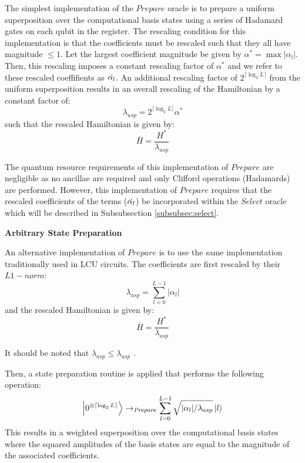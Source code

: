 The simplest implementation of the $\textit{Prepare}$ oracle is to prepare a uniform superposition over the computational basis states using a series of Hadamard gates on each qubit in the register.
The rescaling condition for this implementation is that the coefficients must be rescaled such that they all have magnitude $\leq 1$.
Let the largest coefficient magnitude be given by $\alpha^* = \max{|\alpha_l|}$.
Then, this rescaling imposes a constant rescaling factor of $\alpha^*$ and we refer to these rescaled coeffifients as $\Tilde{\alpha_l}$.
An additional rescaling factor of $2^{\lceil \log_2{L} \rceil}$ from the uniform superposition results in an overall rescaling of the Hamiltonian by a constant factor of:
\begin{equation}
    \lambda_{usp} = 2^{\lceil \log_2{L} \rceil} \alpha^*
\end{equation}
such that the rescaled Hamiltonian is given by:
\begin{equation}
    \bar{H} = \frac{H^*}{\lambda_{usp}}
\end{equation}

The quantum resource requirements of this implementation of $\textit{Prepare}$ are negligible as no ancillae are required and only Clifford operations (Hadamards) are performed.
However, this implementation of $\textit{Prepare}$ requires that the rescaled coefficients of the terms ($\Tilde{\alpha_l}$) be incorporated within the $\textit{Select}$ oracle which will be described in Subsubsection \ref{subsubsec:select}.

\textbf{Arbitrary State Preparation}

An alternative implementation of $\textit{Prepare}$ is to use the same implementation traditionally used in LCU circuits.
The coefficients are first rescaled by their $L1-norm$:
\begin{equation}
    \lambda_{asp} = \sum_{l=0}^{L-1} |\alpha_l|
\end{equation}
and the rescaled Hamiltonian is given by:
\begin{equation}
    \bar{H} = \frac{H^*}{\lambda_{asp}}
\end{equation}

It should be noted that $\lambda_{asp} \leq \lambda_{usp}$  .

Then, a state preparation routine is applied that performs the following operation:
\begin{equation}
    \ket{0^{\otimes \lceil \log_2{L} \rceil}} \rightarrow_{\textit{Prepare}} \sum_{l = 0}^{L-1} \sqrt{|\alpha_l| / \lambda_{asp}} \ket{l}
\end{equation}
This results in a weighted superposition over the computational basis states where the squared amplitudes of the basis states are equal to the magnitude of the associated coefficients.

